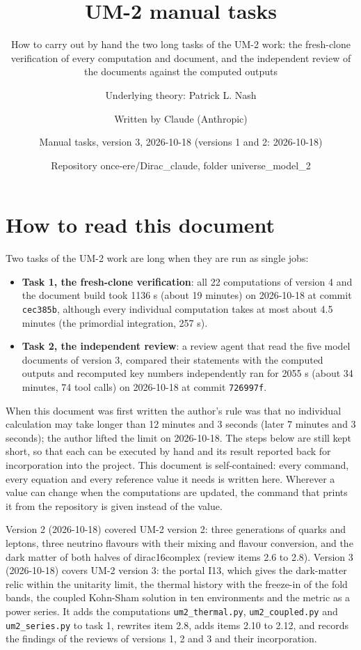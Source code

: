 \documentclass[
  10pt,
]{article}
\title{UM-2 manual tasks}
\subtitle{How to carry out by hand the two long tasks of the UM-2 work:
the fresh-clone verification of every computation and document, and the
independent review of the documents against the computed outputs}
\author{Underlying theory: Patrick L. Nash \and Written by Claude
(Anthropic) \and Manual tasks, version 3, 2026-10-18 (versions 1 and 2:
2026-10-18) \and Repository once-ere/Dirac\_claude, folder
universe\_model\_2}
\date{}
\providecommand{\tightlist}{%
  \setlength{\itemsep}{0pt}\setlength{\parskip}{0pt}}
\begin{document}
\maketitle

{
\hypersetup{linkcolor=}
\setcounter{tocdepth}{3}
\tableofcontents
}
\hypertarget{how-to-read-this-document}{%
\section{How to read this document}\label{how-to-read-this-document}}

Two tasks of the UM-2 work are long when they are run as single jobs:

\begin{itemize}
\tightlist
\item
  \textbf{Task 1, the fresh-clone verification}: all 22 computations of
  version 4 and the document build took 1136 s (about 19 minutes) on
  2026-10-18 at commit \texttt{cec385b}, although every individual
  computation takes at most about 4.5 minutes (the primordial
  integration, 257 s).
\item
  \textbf{Task 2, the independent review}: a review agent that read the
  five model documents of version 3, compared their statements with the
  computed outputs and recomputed key numbers independently ran for 2055
  s (about 34 minutes, 74 tool calls) on 2026-10-18 at commit
  \texttt{726997f}.
\end{itemize}

When this document was first written the author's rule was that no
individual calculation may take longer than 12 minutes and 3 seconds
(later 7 minutes and 3 seconds); the author lifted the limit on
2026-10-18. The steps below are still kept short, so that each can be
executed by hand and its result reported back for incorporation into the
project. This document is self-contained: every command, every equation
and every reference value it needs is written here. Wherever a value can
change when the computations are updated, the command that prints it
from the repository is given instead of the value.

Version 2 (2026-10-18) covered UM-2 version 2: three generations of
quarks and leptons, three neutrino flavours with their mixing and
flavour conversion, and the dark matter of both halves of dirac16complex
(review items 2.6 to 2.8). Version 3 (2026-10-18) covers UM-2 version 3:
the portal I13, which gives the dark-matter relic within the unitarity
limit, the thermal history with the freeze-in of the fold bands, the
coupled Kohn-Sham solution in ten environments and the metric as a power
series. It adds the computations \texttt{um2\_thermal.py},
\texttt{um2\_coupled.py} and \texttt{um2\_series.py} to task 1, rewrites
item 2.8, adds items 2.10 to 2.12, and records the findings of the
reviews of versions 1, 2 and 3 and their incorporation.
\end{document}
